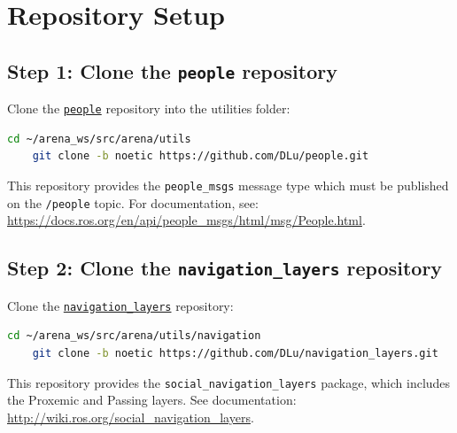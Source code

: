 \section{Repository Setup}
\subsection*{Step 1: Clone the \texttt{people} repository}

Clone the \href{https://github.com/DLu/people/tree/noetic}{\texttt{people}} repository into the utilities folder:

\begin{lstlisting}[language=bash]
    cd ~/arena_ws/src/arena/utils
    git clone -b noetic https://github.com/DLu/people.git
\end{lstlisting}

This repository provides the \texttt{people\_msgs} message type which must be published on the \texttt{/people} 
topic. For documentation, see: \url{https://docs.ros.org/en/api/people_msgs/html/msg/People.html}.



\subsection*{Step 2: Clone the \texttt{navigation\_layers} repository}

Clone the \href{https://github.com/DLu/navigation_layers/tree/noetic}{\texttt{navigation\_layers}} repository:

\begin{lstlisting}[language=bash]
    cd ~/arena_ws/src/arena/utils/navigation
    git clone -b noetic https://github.com/DLu/navigation_layers.git
\end{lstlisting}

This repository provides the \texttt{social\_navigation\_layers} package, which includes the Proxemic and Passing layers. 
See documentation: \url{http://wiki.ros.org/social_navigation_layers}.


